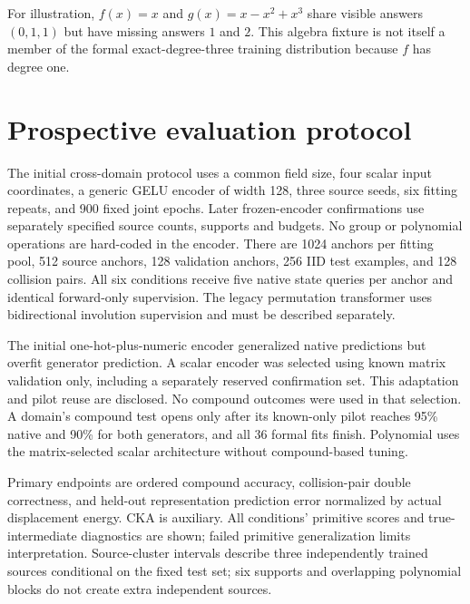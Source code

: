 \documentclass[11pt]{article}
\begin{document}
For illustration, $f(x)=x$ and $g(x)=x-x^2+x^3$ share visible answers $(0,1,1)$ but have missing answers $1$ and $2$. This algebra fixture is not itself a member of the formal exact-degree-three training distribution because $f$ has degree one.

\section{Prospective evaluation protocol}
The initial cross-domain protocol uses a common field size, four scalar input coordinates, a generic GELU encoder of width 128, three source seeds, six fitting repeats, and 900 fixed joint epochs. Later frozen-encoder confirmations use separately specified source counts, supports and budgets. No group or polynomial operations are hard-coded in the encoder. There are 1024 anchors per fitting pool, 512 source anchors, 128 validation anchors, 256 IID test examples, and 128 collision pairs. All six conditions receive five native state queries per anchor and identical forward-only supervision. The legacy permutation transformer uses bidirectional involution supervision and must be described separately.

The initial one-hot-plus-numeric encoder generalized native predictions but overfit generator prediction. A scalar encoder was selected using known matrix validation only, including a separately reserved confirmation set. This adaptation and pilot reuse are disclosed. No compound outcomes were used in that selection. A domain's compound test opens only after its known-only pilot reaches 95\% native and 90\% for both generators, and all 36 formal fits finish. Polynomial uses the matrix-selected scalar architecture without compound-based tuning.

Primary endpoints are ordered compound accuracy, collision-pair double correctness, and held-out representation prediction error normalized by actual displacement energy. CKA is auxiliary. All conditions' primitive scores and true-intermediate diagnostics are shown; failed primitive generalization limits interpretation. Source-cluster intervals describe three independently trained sources conditional on the fixed test set; six supports and overlapping polynomial blocks do not create extra independent sources.


\end{document}
